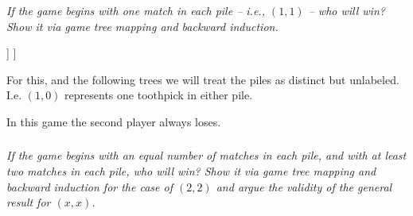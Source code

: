\documentclass[12pt]{amsart}
\begin{document}
\subsubsection{}
\textit{If the game begins with one match in each pile – i.e., $(1,1)$ – who will win? Show it via
	game tree mapping and backward induction.}
	
	\begin{center}
		\begin{forest}
			[\textcolor{white}{(1,1)}, circle, fill=ForestGreen, draw, font={\bfseries\scriptsize}
				[\textcolor{white}{(1,0)}, circle, fill=Maroon, draw, font={\bfseries\scriptsize}, 
						edge label={node[midway,right]{-1}} 
					[\textcolor{white}{(0,0)}, circle, fill=Gray, draw, font={\bfseries\scriptsize}, 
						edge label={node[midway,right]{-1}}
					]
				]
			]
		\end{forest}
	\end{center}
	
	For this, and the following trees we will treat the piles as distinct but unlabeled.
	I.e. $(1,0)$ represents one toothpick in either pile.
	
	In this game the second player always loses.

\subsubsection{}
\textit{If the game begins with an equal number of matches in each pile, and with at least two
	matches in each pile, who will win? Show it via game tree mapping and backward
	induction for the case of $(2,2)$ and argue the validity of the general result for $(x, x)$.}
	
\end{document}
